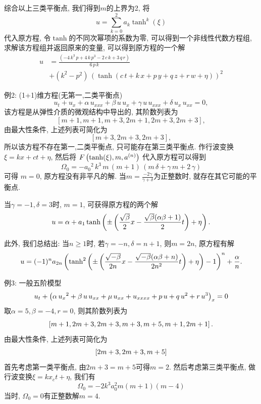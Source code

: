 \begin{frame}
综合以上三类平衡点, 我们得到$m$的上界为2, 将
\[
    u=\sum_{k=0}^2{a_k\tanh^k(\xi)}
\]
代入原方程, 令$\tanh$的不同次幂项的系数为零, 可以得到一个非线性代数方程组, 求解该方程组并返回原来的变量, 可以得到原方程的一个解
\begin{equation*}
\begin{aligned}
    u&=\frac{\left( -4\,{k}^{3}\,p+4\,k\,{p}^{3}-2\,c\,k+3\,q\,r\right) }{6\,p\,k} \\ 
    &+\left( {k}^{2}-{p}^{2}\right) \,\left( \tanh\left( c\,t+k\,x+p\,y+q\,z+r\,w+\eta\right) \right) ^{2}
\end{aligned}
\end{equation*}
\end{frame}

\begin{frame}{例2: (1+1)维方程(无第一,二类平衡点)}
\begin{equation*}
    {{u}_{t}}+{{u}_{x}}+\alpha\,{{u}_{xxx}}+\beta\,u\,{{u}_{x}}+\gamma\,u\,{{u}_{xxx}}+\delta\,{{u}_{x}}\,{{u}_{xx}}=0,
\end{equation*}
该方程是从弹性介质的微观结构中导出的, 其阶数列表为
\[
    [m+1,m+1,m+3,2m+1,2m+3,2m+3],
\]
由最大性条件, 上述列表可简化为 
\[
    [m+3,2m+3,2m+3], 
\]
所以该方程不存在第一,二类平衡点, 只可能存在第三类平衡点.  作行波变换$\xi=kx+ct+\eta$, 然后将 $F\left(\tanh(\xi),m,a^{(n)}\right)$ 代入原方程可以得到 
\begin{equation*}
    \Omega_0=-{{{a}_{0}}}^{2}\,{k}^{3}\,m\,\left( m+1\right) \,\left( m\,\delta+\gamma\,m+2\,\gamma\right)
\end{equation*}
可得 $m=0$, 原方程没有非平凡的解. 当$m=\frac{-2 \gamma}{\gamma+\delta}$为正整数时, 就存在其它可能的平衡点.
\end{frame}

\begin{frame}
当$\gamma=-1,\delta=3$时, $m=1$, 可获得原方程的两个解 
\[
    u=\alpha+a_1\tanh\left(\pm\left(\frac{\sqrt{\beta}}{2}x-\frac{\sqrt{\beta}(\alpha \beta+1)}{2}t\right)+\eta\right). 
\]

此外, 我们总结出: 当$n\ge 1$时, 若$\gamma=-n,\delta=n+1$, 则$m=2n$, 原方程有解 
\begin{equation*}
u=(-1)^n a_{2n} \left(\tanh^2\left(\pm\left(\frac{\sqrt{-\beta}}{2n}x-\frac{\sqrt{-\beta}(\alpha\beta+n)}{2n^2}t\right)+\eta\right)-1\right)^n+\frac{\alpha}{n} .
\end{equation*}
\end{frame}

\begin{frame}{例3: 一般五阶模型}
\[
    u_t+\left(\alpha\,{{{u}_{x}}}^{2}+\beta\,u\,{{u}_{xx}}+\mu\,{{u}_{xx}}+{{u}_{xxxx}}+p\,u+q\,{u}^{2}+r\,{u}^{3} \right)_x = 0
\]
取$\alpha=5,\beta=-4,r=0$, 则其阶数列表为 
\[
    \left[m+1,2m+3,2m+3,m+3,m+5,m+1,2m+1\right] .
\]
由最大性条件, 上述列表可简化为 
\[
    \left[2m+3,2m+3,m+5\right]
\]
首先考虑第一类平衡点, 由$2m+3=m+5$可得$m=2$.
然后考虑第三类平衡点, 做行波变换$\xi=kx_ct+\eta$, 我们有 
\[
    \Omega_0 = -2k^3a_0^2m(m+1)(m-4) 
\]
当时, $\Omega_0=0$有正整数解$m=4$. 
\end{frame}

